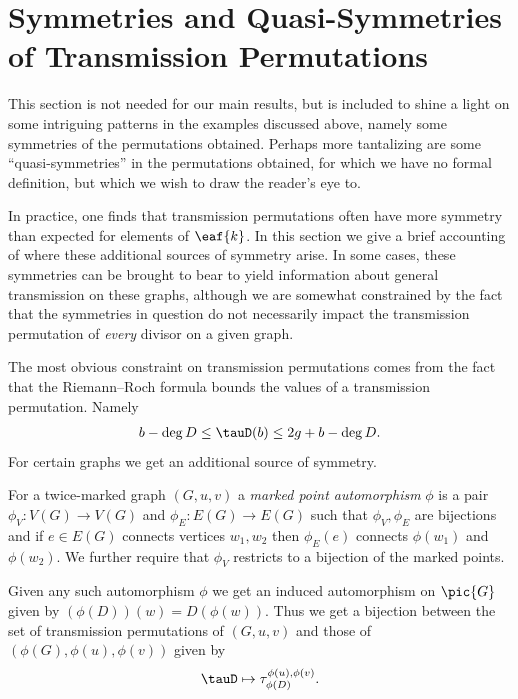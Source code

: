 \section{Symmetries and Quasi-Symmetries of Transmission Permutations}\label{ssec:mpAutos}

This section is not needed for our main results, but is included to shine a light on some intriguing patterns in the examples discussed above, namely some symmetries of the permutations obtained. Perhaps more tantalizing are some ``quasi-symmetries'' in the permutations obtained, for which we have no formal definition, but which we wish to draw the reader's eye to.

In practice, one finds that transmission permutations often have more symmetry than expected for elements of $\eaf{k}$. In this section we give a brief accounting of where these additional sources of symmetry arise. In some cases, these symmetries can be brought to bear to yield information about general transmission on these graphs, although we are somewhat constrained by the fact that the symmetries in question do not necessarily impact the transmission permutation of \textit{every} divisor on a given graph.

The most obvious constraint on transmission permutations comes from the fact that the Riemann--Roch formula bounds the values of a transmission permutation. Namely
\begin{align}\label{eq-RRTauBounds}
    b-\deg D \leq \tauD(b) \leq 2g +b-\deg D.
\end{align}
For certain graphs we get an additional source of symmetry.

\begin{defi}
    For a twice-marked graph $(G,u,v)$ a \textit{marked point automorphism} $\phi$ is a pair $\phi_V:V(G)\to V(G)$ and $\phi_E:E(G)\to E(G)$ such that $\phi_V,\phi_E$ are bijections and if $e \in E(G)$ connects vertices $w_1,w_2$ then $\phi_E(e)$ connects $\phi(w_1)$ and $\phi(w_2)$. We further require that $\phi_V$ restricts to a bijection of the marked points.
\end{defi}

Given any such automorphism $\phi$ we get an induced automorphism on $\pic{G}$ given by $(\phi(D))(w) = D(\phi(w))$. Thus we get a bijection between the set of transmission permutations of $(G,u,v)$ and those of $(\phi(G),\phi(u),\phi(v))$ given by
\begin{align*}
    \tauD \mapsto \tau_{\phi(D)}^{\phi(u),\phi(v)}.
\end{align*}

